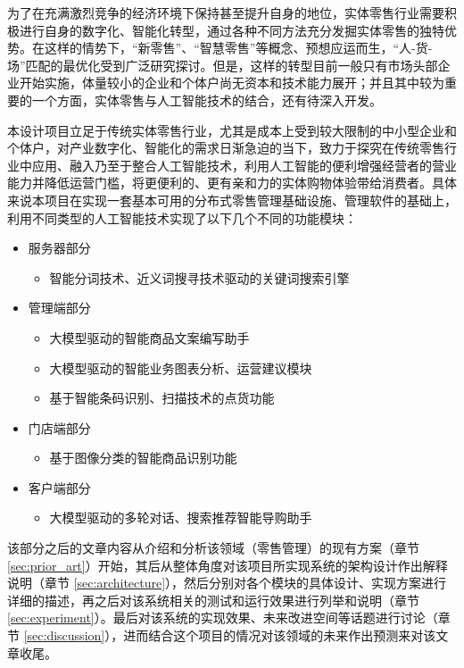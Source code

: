 为了在充满激烈竞争的经济环境下保持甚至提升自身的地位，实体零售行业需要积极进行自身的数字化、智能化转型，通过各种不同方法充分发掘实体零售的独特优势。在这样的情势下，“新零售”\cite{zhao2017new_retail,du2017new_retail}、“智慧零售”\cite{liao2019intelligent_retail}等概念、预想应运而生，“人-货-场”匹配的最优化\cite{wang2018person_good_place}受到广泛研究探讨。但是，这样的转型目前一般只有市场头部企业开始实施，体量较小的企业和个体户尚无资本和技术能力展开；并且其中较为重要的一个方面，实体零售与人工智能技术的结合，还有待深入开发。

本设计项目立足于传统实体零售行业，尤其是成本上受到较大限制的中小型企业和个体户，对产业数字化、智能化的需求日渐急迫的当下，致力于探究在传统零售行业中应用、融入乃至于整合人工智能技术，利用人工智能的便利增强经营者的营业能力并降低运营门槛，将更便利的、更有亲和力的实体购物体验带给消费者。具体来说本项目在实现一套基本可用的分布式零售管理基础设施、管理软件的基础上，利用不同类型的人工智能技术实现了以下几个不同的功能模块：

\begin{itemize}
    \item 服务器部分
    \begin{itemize}
        \item 智能分词技术、近义词搜寻技术驱动的关键词搜索引擎
    \end{itemize}
    \item 管理端部分
    \begin{itemize}
        \item 大模型驱动的智能商品文案编写助手
        \item 大模型驱动的智能业务图表分析、运营建议模块
        \item 基于智能条码识别、扫描技术的点货功能
    \end{itemize}
    \item 门店端部分
    \begin{itemize}
        \item 基于图像分类的智能商品识别功能
    \end{itemize}
    \item 客户端部分
    \begin{itemize}
        \item 大模型驱动的多轮对话、搜索推荐智能导购助手
    \end{itemize}
\end{itemize}

该部分之后的文章内容从介绍和分析该领域（零售管理）的现有方案（章节 \ref{sec:prior_art}）开始，其后从整体角度对该项目所实现系统的架构设计作出解释说明（章节 \ref{sec:architecture}），然后分别对各个模块的具体设计、实现方案进行详细的描述，再之后对该系统相关的测试和运行效果进行列举和说明（章节 \ref{sec:experiment}）。最后对该系统的实现效果、未来改进空间等话题进行讨论（章节 \ref{sec:discussion}），进而结合这个项目的情况对该领域的未来作出预测来对该文章收尾。